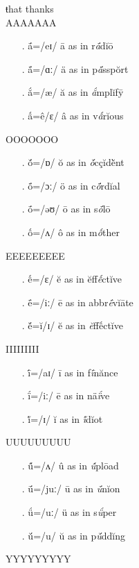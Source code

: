 {\linfonta \Huge ŧhat thanks\\
	AAAAAAA
	\begin{itemize}[leftmargin={-3pt}]
		\item[.] \'ā=/{\unifont eɪ}/ \={a} as in r\textit{\'ā}d\u{i}\=o
		\item[.] \'ä=/{\unifont ɑː}/ \"{a} as in p\textit{\'ä}ssp\u{o}rt	
		\item[.] \'ă=/{\unifont æ}/ \u{a} as in \textit{\'ă}mplĭf\=y	
		\item[.] \'â=ê/{\unifont ɛ}/ \^{a} as in v\textit{\'â}rĭous
	\end{itemize}
	OOOOOOO
	\begin{itemize}[leftmargin={-3pt}]
		\item[.] \'ŏ=/{\unifont ɒ}/ \u{o} as in \textit{\'ŏ}cç\u{i}d\`{ĕ}nt 
		\item[.] \'ö=/{\unifont ɔː}/ \"{o} as in c\textit{\'ö}rd\u{i}al
		\item[.] \'ō=/{\unifont əʊ}/ \={o} as in s\textit{\'ō}lō		
		\item[.] \'ô=/{\unifont ʌ}/ \^{o} as in m\textit{\'ô}ther		
	\end{itemize}	
	EEEEEEEEE
	\begin{itemize}[leftmargin={-3pt}]
		\item[.] \'ê=/{\unifont ɛ}/ \u{e} as in ĕff\textit{\'ê}ctĭve
		\item[.] \'ē=/{\unifont iː}/ \={e} as in abbr\textit{\'ē}vĭāte
		\item[.] \'ĕ=ĭ/{\unifont ɪ}/ \u{e} as in \textit{ĕ}ff\'êctĭve %
	\end{itemize}		
	IIIIIIIII
	\begin{itemize}[leftmargin={-3pt}]
		\item[.] \'ī=/{\unifont aɪ}/ \={i} as in f\textit{\'ī}nănce 
		\item[.] \'ï=/{\unifont iː}/ \={e} as in nä\textit{\'ï}ve
		\item[.] \'ĭ=/{\unifont ɪ}/ \u{i} as in \textit{\'ĭ}dĭot
	\end{itemize}		
	UUUUUUUUU
	\begin{itemize}[leftmargin={-3pt}]
		\item[.] \'û=/{\unifont ʌ}/ \^{u} as in \textit{\'û}plōad
		\item[.] \'ū=/{\unifont juː}/ \={u} as in \textit{\'ū}nĭon
		\item[.] \'ü=/{\unifont uː}/ \"{u} as in s\textit{\'ü}per
		\item[.] \'ŭ=/{\unifont u}/ \u{u} as in p\textit{\'ŭ}ddĭng
	\end{itemize}	
	YYYYYYYYY
	
}
